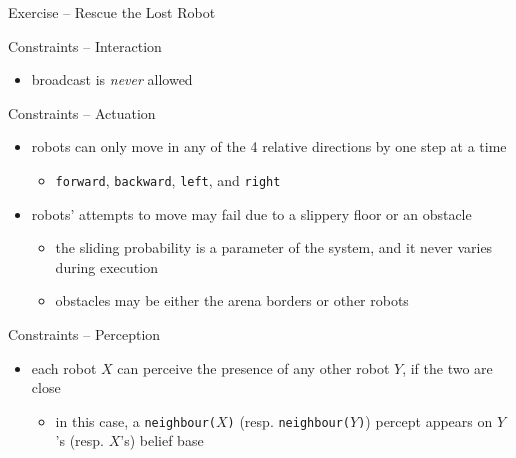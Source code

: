 \documentclass[presentation]{beamer}\mode<presentation>{\usetheme{AMSBolognaFC}}
\begin{document}
\begin{frame}[c, allowframebreaks]{Exercise \currentExercise{} -- Rescue the Lost Robot}
\begin{exampleblock}{Constraints -- Interaction}
\begin{itemize}
            \item broadcast is \emph{never} allowed
        \end{itemize}
    \end{exampleblock}

    \begin{exampleblock}{Constraints -- Actuation}
        \begin{itemize}
            \item robots can only \alert{move} in any of the \alert{4 relative directions} by one step at a time
            \begin{itemize}
                \item[i.e.] \texttt{forward}, \texttt{backward}, \texttt{left}, and \texttt{right}
            \end{itemize}
        
            \item robots' attempts to move may fail due to a \alert{slippery floor} or an \alert{obstacle}
            \begin{itemize}
                \item the \alert{sliding probability} is a parameter of the system, and it never varies during execution
                
                \item obstacles may be either the arena borders or other robots
            \end{itemize}
            
        \end{itemize}
    \end{exampleblock}

    \begin{exampleblock}{Constraints -- Perception}
        \begin{itemize}
            \item each robot $X$ can perceive the \alert{presence} of any other robot $Y$, if the two are close
            \begin{itemize}
                \item in this case, a \texttt{neighbour($X$)} (resp. \texttt{neighbour($Y$)}) percept appears on $Y$'s (resp. $X$'s) belief base
            \end{itemize}
        

\end{itemize}
\end{exampleblock}
\end{frame}
\end{document}
